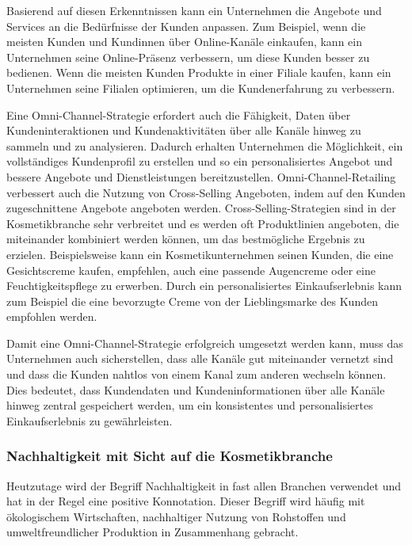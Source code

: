 Basierend auf diesen Erkenntnissen kann ein Unternehmen die Angebote und Services an die Bedürfnisse der Kunden anpassen. Zum Beispiel, wenn die meisten Kunden und Kundinnen über Online-Kanäle einkaufen, kann ein Unternehmen seine Online-Präsenz verbessern, um diese Kunden besser zu bedienen. Wenn die meisten Kunden Produkte in einer Filiale kaufen, kann ein Unternehmen seine Filialen optimieren, um die Kundenerfahrung zu verbessern.
\newline

Eine Omni-Channel-Strategie erfordert auch die Fähigkeit, Daten über Kundeninteraktionen und Kundenaktivitäten über alle Kanäle hinweg zu sammeln und zu analysieren. Dadurch erhalten Unternehmen die Möglichkeit, ein vollständiges Kundenprofil zu erstellen und so ein personalisiertes Angebot und bessere Angebote und Dienstleistungen bereitzustellen. Omni-Channel-Retailing verbessert auch die Nutzung von Cross-Selling Angeboten, indem auf den Kunden zugeschnittene Angebote angeboten werden. Cross-Selling-Strategien sind in der Kosmetikbranche sehr verbreitet und es werden oft Produktlinien angeboten, die miteinander kombiniert werden können, um das bestmögliche Ergebnis zu erzielen. Beispielsweise kann ein Kosmetikunternehmen seinen Kunden, die eine Gesichtscreme kaufen, empfehlen, auch eine passende Augencreme oder eine Feuchtigkeitspflege zu erwerben. Durch ein personalisiertes Einkaufserlebnis kann zum Beispiel die eine bevorzugte Creme von der Lieblingsmarke des Kunden empfohlen werden.
\newline

Damit eine Omni-Channel-Strategie erfolgreich umgesetzt werden kann, muss das Unternehmen auch sicherstellen, dass alle Kanäle gut miteinander vernetzt sind und dass die Kunden nahtlos von einem Kanal zum anderen wechseln können. Dies bedeutet, dass Kundendaten und Kundeninformationen über alle Kanäle hinweg zentral gespeichert werden, um ein konsistentes und personalisiertes Einkaufserlebnis zu gewährleisten.

\subsubsection{Nachhaltigkeit mit Sicht auf die Kosmetikbranche}\label{unterabschnitt_3_4_2}
Heutzutage wird der Begriff Nachhaltigkeit in fast allen Branchen verwendet und hat in der Regel eine positive Konnotation. Dieser Begriff wird häufig mit ökologischem Wirtschaften, nachhaltiger Nutzung von Rohstoffen und umweltfreundlicher Produktion in Zusammenhang gebracht.
\newline

